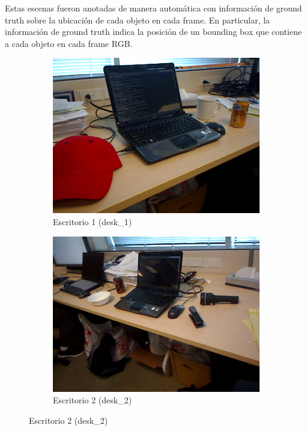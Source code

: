 Estas escenas fueron anotadas de manera automática con información de ground truth sobre la ubicación de cada objeto en cada frame. En particular, la información de ground truth indica la posición de un bounding box que contiene a cada objeto en cada frame RGB.

\begin{figure}[t]
    \centering
    \begin{subfigure}[b]{0.4\textwidth}
		\centering
        \includegraphics[width=\textwidth]{img/base_rgbd/desk_1.png}
        \caption{Escritorio 1 (desk\_1)}
		\label{fig:desk_1}
    \end{subfigure}
    \quad
    \begin{subfigure}[b]{0.4\textwidth}
		\centering
        \includegraphics[width=\textwidth]{img/base_rgbd/desk_2.png}
        \caption{Escritorio 2 (desk\_2)}
		\label{fig:desk_2}
    \end{subfigure}


\end{figure}

